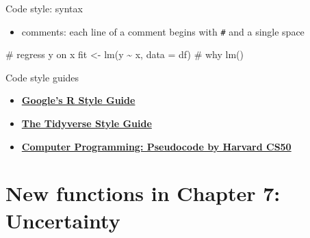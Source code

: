 \documentclass[
  ignorenonframetext,
]{beamer}
\newenvironment{Shaded}{\begin{snugshade}}{\end{snugshade}}
\newcommand{\AttributeTok}[1]{\textcolor[rgb]{0.40,0.45,0.13}{#1}}
\newcommand{\CommentTok}[1]{\textcolor[rgb]{0.37,0.37,0.37}{#1}}
\newcommand{\FunctionTok}[1]{\textcolor[rgb]{0.28,0.35,0.67}{#1}}
\newcommand{\NormalTok}[1]{\textcolor[rgb]{0.00,0.23,0.31}{#1}}
\newcommand{\OtherTok}[1]{\textcolor[rgb]{0.00,0.23,0.31}{#1}}
\newcommand{\SpecialCharTok}[1]{\textcolor[rgb]{0.37,0.37,0.37}{#1}}
\providecommand{\tightlist}{%
  \setlength{\itemsep}{0pt}\setlength{\parskip}{0pt}}\usepackage{longtable,booktabs,array}
\begin{document}
\begin{frame}[fragile]{Code style: syntax}
\protect\hypertarget{code-style-syntax-7}{}
\begin{itemize}
\tightlist
\item
  comments: each line of a comment begins with \texttt{\#} and a single
  space
\end{itemize}

\begin{Shaded}
\begin{Highlighting}[]
\CommentTok{\# regress y on x}
\NormalTok{fit }\OtherTok{\textless{}{-}} \FunctionTok{lm}\NormalTok{(y }\SpecialCharTok{\textasciitilde{}}\NormalTok{ x, }\AttributeTok{data =}\NormalTok{ df) }\CommentTok{\# why lm()}
\end{Highlighting}
\end{Shaded}
\end{frame}

\begin{frame}{Code style guides}
\protect\hypertarget{code-style-guides}{}
\begin{tcolorbox}[enhanced jigsaw, titlerule=0mm, left=2mm, toptitle=1mm, leftrule=.75mm, coltitle=black, rightrule=.15mm, bottomrule=.15mm, breakable, opacityback=0, toprule=.15mm, colframe=quarto-callout-note-color-frame, opacitybacktitle=0.6, arc=.35mm, colbacktitle=quarto-callout-note-color!10!white, bottomtitle=1mm, title=\textcolor{quarto-callout-note-color}{\faInfo}\hspace{0.5em}{Note}, colback=white]

\begin{itemize}
\tightlist
\item
  \href{https://google.github.io/styleguide/Rguide.html}{\textbf{Google's
  R Style Guide}}
\item
  \href{https://style.tidyverse.org/index.html}{\textbf{The Tidyverse
  Style Guide}}
\item
  \href{https://cs50.harvard.edu/ap/2020/assets/pdfs/pseudocode.pdf}{\textbf{Computer
  Programming: Pseudocode by Harvard CS50}}
\end{itemize}

\end{tcolorbox}
\end{frame}

\hypertarget{new-functions-in-chapter-7-uncertainty}{%
\section{\texorpdfstring{New functions in \textbf{Chapter 7:
Uncertainty}}{New functions in Chapter 7: Uncertainty}}\label{new-functions-in-chapter-7-uncertainty}}
\end{document}
